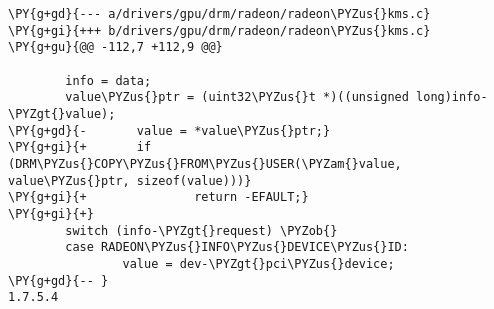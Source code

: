 \begin{Verbatim}[commandchars=\\\{\}]
\PY{g+gd}{--- a/drivers/gpu/drm/radeon/radeon\PYZus{}kms.c}
\PY{g+gi}{+++ b/drivers/gpu/drm/radeon/radeon\PYZus{}kms.c}
\PY{g+gu}{@@ -112,7 +112,9 @@}

        info = data;
        value\PYZus{}ptr = (uint32\PYZus{}t *)((unsigned long)info-\PYZgt{}value);
\PY{g+gd}{-       value = *value\PYZus{}ptr;}
\PY{g+gi}{+       if (DRM\PYZus{}COPY\PYZus{}FROM\PYZus{}USER(\PYZam{}value, value\PYZus{}ptr, sizeof(value)))}
\PY{g+gi}{+               return -EFAULT;}
\PY{g+gi}{+}
        switch (info-\PYZgt{}request) \PYZob{}
        case RADEON\PYZus{}INFO\PYZus{}DEVICE\PYZus{}ID:
                value = dev-\PYZgt{}pci\PYZus{}device;
\PY{g+gd}{-- }
1.7.5.4
\end{Verbatim}

